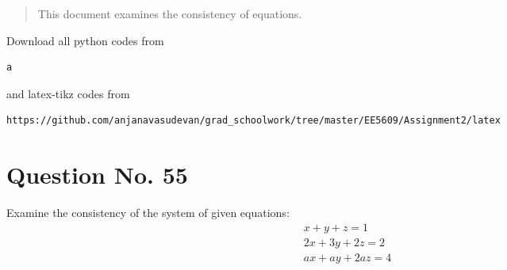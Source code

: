 \documentclass[journal,12pt,twocolumn]{IEEEtran}
\begin{document}
\makeatletter
\renewcommand*\env@matrix[1][*\c@MaxMatrixCols c]{%
  \hskip -\arraycolsep
  \let\@ifnextchar\new@ifnextchar
  \array{#1}}
\makeatother
\newcommand{\myvec}[1]{\ensuremath{\begin{pmatrix}#1\end{pmatrix}}}
\newcommand{\BAR}{%
  \hspace{-\arraycolsep}%
  \strut\vrule %
  \hspace{-\arraycolsep}%
}
\renewcommand{\vec}[1]{\mathbf{#1}}
\maketitle
\begin{abstract}
This document examines the consistency of equations.
\end{abstract}
Download all python codes from 
%
\begin{lstlisting}
a
\end{lstlisting}
%
and latex-tikz codes from 
%
\begin{lstlisting}
https://github.com/anjanavasudevan/grad_schoolwork/tree/master/EE5609/Assignment2/latex
\end{lstlisting}
%
\section{Question No. 55}
Examine the consistency of the system of given equations:
\begin{align}
		x+y+z =1 
		\\2x+3y+2z = 2
		\\ax+ay+2az = 4
\end{align}
\end{document}
